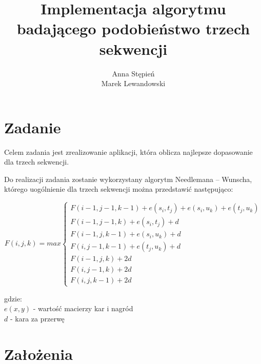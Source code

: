 \documentclass[12pt, a4paper]{article}
\title{\textbf{Implementacja algorytmu badającego podobieństwo trzech sekwencji}}
\author{Anna Stępień \\ Marek Lewandowski}
\date{}
\begin{document}
\maketitle

\section{Zadanie}
Celem zadania jest zrealizowanie aplikacji, która oblicza najlepsze dopasowanie dla trzech sekwencji. 

Do realizacji zadania zostanie wykorzystany algorytm Needlemana -- Wunscha, którego uogólnienie dla trzech sekwencji można przedstawić następująco:

\begin{equation}
  F(i, j, k)= max \begin{cases}
    F(i-1, j-1, k-1) + e(s_i, t_j) + e(s_i, u_k) + e(t_j, u_k)\\
    F(i-1, j-1, k) + e(s_i, t_j) + d\\
    F(i-1, j, k-1) + e(s_i, u_k) + d\\
    F(i, j-1, k-1) + e(t_j, u_k) + d\\
    F(i-1, j, k) + 2d\\
    F(i, j-1, k) + 2d\\
    F(i, j, k-1) + 2d
  \end{cases}
\end{equation}

gdzie:\\
$e(x, y)$ - wartość macierzy kar i nagród\\
$d$ - kara za przerwę

\section{Założenia}
\end{document}
